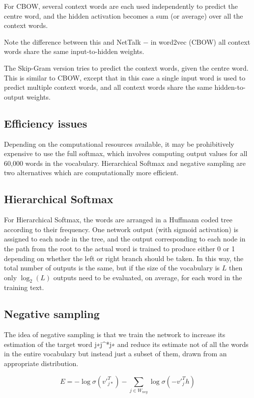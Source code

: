 \documentclass[11pt]{article}
\begin{document}
For CBOW, several context words are each used independently to predict the centre word, and the hidden activation becomes a sum (or average) over all the context words.

Note the difference between this and NetTalk $-$ in word2vec (CBOW) all context words share the same input-to-hidden weights.

The Skip-Gram version tries to predict the context words, given the centre word.
This is similar to CBOW, except that in this case a single input word is used to predict multiple context words, and all context words share the same hidden-to-output weights.

\subsection{Efficiency issues}\label{subsec:efficiency-issues}
Depending on the computational resources available, it may be prohibitively expensive to use the full softmax, which involves computing output values for all 60,000 words in the vocabulary.
Hierarchical Softmax and negative sampling are two alternatives which are computationally more efficient.

\subsection{Hierarchical Softmax}\label{subsec:hierarchical-softmax}
For Hierarchical Softmax, the words are arranged in a Huffmann coded tree according to their frequency.
One network output (with sigmoid activation) is assigned to each node in the tree, and the output corresponding to each node in the path from the root to the actual word is trained to produce either 0 or 1 depending on whether the left or right branch should be taken.
In this way, the total number of outputs is the same, but if the size of the vocabulary is $L$ then only $\log_2(L)$ outputs need to be evaluated, on average, for each word in the training text.

\subsection{Negative sampling}\label{subsec:negative-sampling}
The idea of negative sampling is that we train the network to increase its estimation of the target word j∗j^*j∗ and reduce its estimate not of all the words in the entire vocabulary but instead just a subset of them, drawn from an appropriate distribution.

\[E = -\log \sigma(v'_{j*}^T) - \sum_{j \in W_{neg}} \log \sigma (-v'_{j}^{T}h)\]
\end{document}
